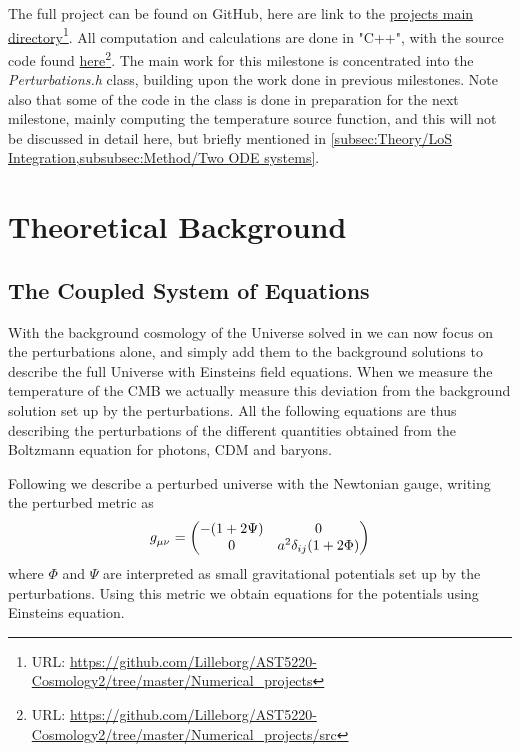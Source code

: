 \documentclass[10pt,a4paper]{article}
\providecommand{\rCDM}
{
\rm{CDM}
}
\begin{document}
The full project can be found on GitHub, here are link to the \href{https://github.com/Lilleborg/AST5220-Cosmology2/tree/master/Numerical_projects}{projects main directory}\footnote{URL: \url{https://github.com/Lilleborg/AST5220-Cosmology2/tree/master/Numerical_projects}}. All computation and calculations are done in "C++", with the source code found \href{https://github.com/Lilleborg/AST5220-Cosmology2/tree/master/Numerical_projects/src}{here}\footnote{URL: \url{https://github.com/Lilleborg/AST5220-Cosmology2/tree/master/Numerical_projects/src}}. The main work for this milestone is concentrated into the \textit{Perturbations.h} class, building upon the work done in previous milestones. Note also that some of the code in the class is done in preparation for the next milestone, mainly computing the temperature source function, and this will not be discussed in detail here, but briefly mentioned in \cref{subsec:Theory/LoS Integration,subsubsec:Method/Two ODE systems}.

\section{Theoretical Background}
\label{sec:Theory}

\subsection{The Coupled System of Equations}
\label{subsec:Theory/Coupled equations}

With the background cosmology of the Universe solved in \cite{milestone1} we can now focus on the perturbations alone, and simply add them to the background solutions to describe the full Universe with Einsteins field equations. When we measure the temperature of the CMB we actually measure this deviation from the background solution set up by the perturbations. All the following equations are thus describing the perturbations of the different quantities obtained from the Boltzmann equation for photons, \rCDM and baryons.

Following \cite{Calin} we describe a perturbed universe with the Newtonian gauge, writing the perturbed metric as 
\begin{equation}
\tensor{g}{_\mu_\nu} =
  \begin{pmatrix}
    -(1+2\Psi) & 0
    \\
    0 & a^2\delta_{ij}(1+2\Phi)
  \end{pmatrix}
\end{equation}
where $\Phi$ and $\Psi$ are interpreted as small gravitational potentials set up by the perturbations. Using this metric we obtain equations for the potentials using Einsteins equation.
\end{document}
